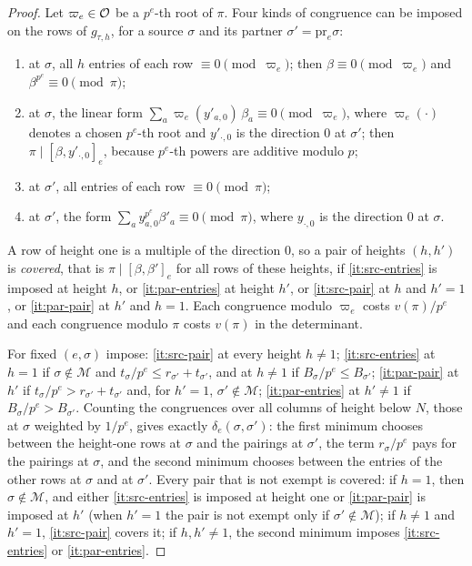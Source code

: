 \begin{proof}
Let $\varpi_e\in\mathcal{O}$ be a $p^e$-th root of $\pi$. Four kinds of congruence can be imposed on the rows
of $g_{\tau,h}$, for a source $\sigma$ and its partner $\sigma'=\mathrm{pr}_e\sigma$:
\begin{enumerate}[label=\textup{(\arabic*)}]
\item\label{it:src-entries} at $\sigma$, all $h$ entries of each row $\equiv0\pmod{\varpi_e}$; then
$\beta\equiv0\pmod{\varpi_e}$ and $\beta^{p^e}\equiv0\pmod\pi$;
\item\label{it:src-pair} at $\sigma$, the linear form $\sum_a\varpi_e(y'_{a,0})\,\beta_a\equiv0
\pmod{\varpi_e}$, where $\varpi_e(\cdot)$ denotes a chosen $p^e$-th root and $y'_{\cdot,0}$ is the
direction $0$ at $\sigma'$; then $\pi\mid[\beta,y'_{\cdot,0}]_e$, because $p^e$-th powers are additive
modulo $p$;
\item\label{it:par-entries} at $\sigma'$, all entries of each row $\equiv0\pmod\pi$;
\item\label{it:par-pair} at $\sigma'$, the form $\sum_ay_{a,0}^{p^e}\beta'_a\equiv0\pmod\pi$, where
$y_{\cdot,0}$ is the direction $0$ at $\sigma$.
\end{enumerate}
A row of height one is a multiple of the direction $0$, so a pair of heights $(h,h')$ is
\emph{covered}, that is $\pi\mid[\beta,\beta']_e$ for all rows of these heights, if \ref{it:src-entries}
is imposed at height $h$, or \ref{it:par-entries} at height $h'$, or \ref{it:src-pair} at $h$ and
$h'=1$, or \ref{it:par-pair} at $h'$ and $h=1$. Each congruence modulo $\varpi_e$ costs $v(\pi)/p^e$
and each congruence modulo $\pi$ costs $v(\pi)$ in the determinant.

For fixed $(e,\sigma)$ impose: \ref{it:src-pair} at every height $h\ne1$; \ref{it:src-entries} at
$h=1$ if $\sigma\notin\mathcal M$ and $t_\sigma/p^e\le r_{\sigma'}+t_{\sigma'}$, and at $h\ne1$ if
$B_\sigma/p^e\le B_{\sigma'}$; \ref{it:par-pair} at $h'$ if $t_\sigma/p^e>r_{\sigma'}+t_{\sigma'}$ and,
for $h'=1$, $\sigma'\notin\mathcal M$; \ref{it:par-entries} at $h'\ne1$ if $B_\sigma/p^e>B_{\sigma'}$.
Counting the congruences over all columns of height below $N$, those at $\sigma$ weighted by
$1/p^e$, gives exactly $\delta_e(\sigma,\sigma')$: the first minimum chooses between the height-one
rows at $\sigma$ and the pairings at $\sigma'$, the term $r_\sigma/p^e$ pays for the pairings at
$\sigma$, and the second minimum chooses between the entries of the other rows at $\sigma$ and at
$\sigma'$. Every pair that is not exempt is covered: if $h=1$, then $\sigma\notin\mathcal M$, and
either \ref{it:src-entries} is imposed at height one or \ref{it:par-pair} is imposed at $h'$ (when
$h'=1$ the pair is not exempt only if $\sigma'\notin\mathcal M$); if $h\ne1$ and $h'=1$,
\ref{it:src-pair} covers it; if $h,h'\ne1$, the second minimum imposes \ref{it:src-entries} or
\ref{it:par-entries}.


\end{proof}
